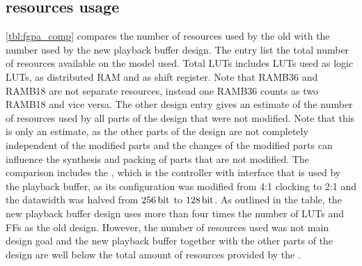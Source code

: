 \subsection{\FPGA{} resources usage}
\autoref{tbl:fgpa_comp} compares the number of \FPGA{} resources used by the old with the number used by the new playback buffer design. The \FPGA{} entry list the total number of resources available on the \FPGA{} model used. Total LUTs includes LUTs used as logic LUTs, as distributed RAM and as shift register. Note that RAMB36 and RAMB18 are not separate resources, instead one RAMB36 counts as two RAMB18 and vice versa.
The other \FPGA{} design entry gives an estimate of the number of resources used by all parts of the \FPGA{} design that were not modified. Note that this is only an estimate, as the other parts of the design are not completely independent of the modified parts and the changes of the modified parts can influence the synthesis and packing of parts that are not modified.
The comparison includes the \XilinxMIG{}, which is the \DDR{} controller with \AXI{} interface that is used by the playback buffer, as its configuration was modified from 4:1 clocking to 2:1 and the datawidth was halved from $\SI{256}{\bit}$ to $\SI{128}{\bit}$.
As outlined in the table, the new playback buffer design uses more than four times the number of LUTs and FFs as the old design. However, the number of resources used was not main design goal and the new playback buffer together with the other parts of the \FPGA{} design are well below the total amount of resources provided by the \FPGA{}.
